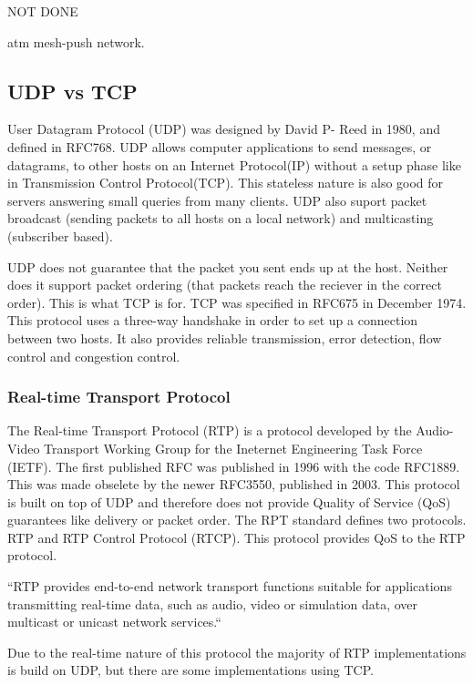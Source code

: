NOT DONE

atm mesh-push network.

\subsection{UDP vs TCP}
User Datagram Protocol (UDP) was designed by David P- Reed in 1980, and defined in RFC768. UDP allows computer applications to send messages, or datagrams, to other hosts on an Internet Protocol(IP) without a setup phase like in Transmission Control Protocol(TCP). This stateless nature is also good for servers answering small queries from many clients. UDP also suport packet broadcast (sending packets to all hosts on a local network) and multicasting (subscriber based).

UDP does not guarantee that the packet you sent ends up at the host. Neither does it support packet ordering (that packets reach the reciever in the correct order). This is what TCP is for. TCP was specified in RFC675 in December 1974. This protocol uses a three-way handshake in order to set up a connection between two hosts. It also provides reliable transmission, error detection, flow control and congestion control. 

\subsubsection{Real-time Transport Protocol}
The Real-time Transport Protocol (RTP) is a protocol developed by the Audio-Video Transport Working Group for the Ineternet Engineering Task Force (IETF). The first published RFC was published in 1996 with the code RFC1889. This was made obselete by the newer RFC3550, published in 2003\cite{RFC3550}. This protocol is built on top of UDP and therefore does not provide Quality of Service (QoS) guarantees like delivery or packet order. The RPT standard defines two protocols. RTP and RTP Control Protocol (RTCP). This protocol provides QoS to the RTP protocol.

``RTP provides end-to-end network transport functions suitable for applications transmitting real-time data, such as audio, video or simulation data, over multicast or unicast network services.``\cite{RFC3550}

Due to the real-time nature of this protocol the majority of RTP implementations is build on UDP, but there are some implementations using TCP.







